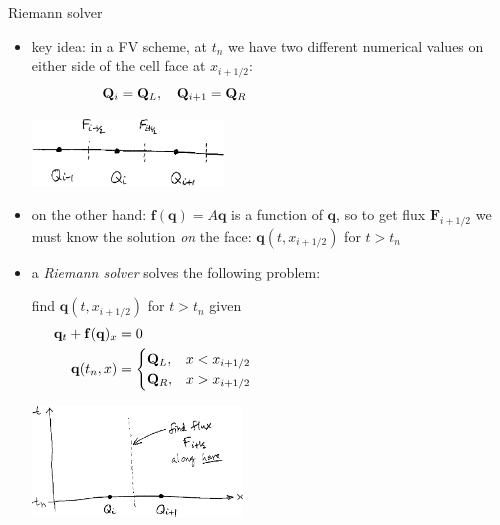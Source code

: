 \documentclass[10pt,dvipsnames,usepdftitle=false,
hyperref={pdftitle = {Finite volume methods},
    pdfauthor = {Ed Bueler}}]{beamer}
\newcommand{\bbf}{\mathbf{f}}
\newcommand{\bq}{\mathbf{q}}
\newcommand{\bF}{\mathbf{F}}
\newcommand{\bQ}{\mathbf{Q}}
\begin{document}
\begin{frame}{Riemann solver}

\begin{itemize}
\item key idea: in a FV scheme, at $t_n$ we have \alert{two different numerical values on either side of the cell face} at $x_{i+1/2}$:
    $$\bQ_{i} = \bQ_L, \quad \bQ_{i+1} = \bQ_R \hspace{50mm}$$

\vspace{-12mm}
\hfill \includegraphics[width=0.4\textwidth]{figs/cellfluxsketch}

\medskip
\item on the other hand: $\bbf(\bq) = A\bq$ is a function of $\bq$, so to get flux $\bF_{i+1/2}$ we must know the solution \emph{on} the face: $\bq(t,x_{i+1/2})$ for $t > t_n$
\item a \emph{Riemann solver} solves the following problem:

\bigskip
find $\bq(t,x_{i+1/2})$ for $t > t_n$ given
\begin{align*}
\bq_t + \bbf(\bq)_x &= 0 \\
\bq(t_n,x) &= \begin{cases} \bQ_L, & x < x_{i+1/2} \\
                            \bQ_R, & x > x_{i+1/2} \end{cases} \hspace{60mm}
\end{align*}

\vspace{-30mm}
\hfill \includegraphics[width=0.44\textwidth]{figs/rsolversketch}
\end{itemize}
\end{frame}
\end{document}
